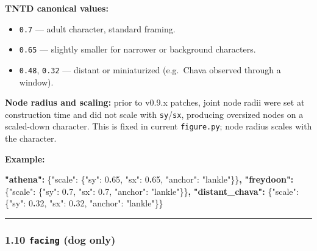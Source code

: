 \documentclass[
  11pt,
]{book}
\newenvironment{Shaded}{}{}
\newcommand{\DataTypeTok}[1]{\textcolor[rgb]{0.56,0.13,0.00}{#1}}
\newcommand{\DecValTok}[1]{\textcolor[rgb]{0.25,0.63,0.44}{#1}}
\newcommand{\ErrorTok}[1]{\textcolor[rgb]{1.00,0.00,0.00}{\textbf{#1}}}
\newcommand{\FunctionTok}[1]{\textcolor[rgb]{0.02,0.16,0.49}{#1}}
\newcommand{\StringTok}[1]{\textcolor[rgb]{0.25,0.44,0.63}{#1}}
\providecommand{\tightlist}{%
  \setlength{\itemsep}{0pt}\setlength{\parskip}{0pt}}
\begin{document}
\textbf{TNTD canonical values:}

\begin{itemize}
\tightlist
\item
  \texttt{0.7} --- adult character, standard framing.
\item
  \texttt{0.65} --- slightly smaller for narrower or background
  characters.
\item
  \texttt{0.48}, \texttt{0.32} --- distant or miniaturized (e.g.~Chava
  observed through a window).
\end{itemize}

\textbf{Node radius and scaling:} prior to v0.9.x patches, joint node
radii were set at construction time and did not scale with
\texttt{sy}/\texttt{sx}, producing oversized nodes on a scaled-down
character. This is fixed in current \texttt{figure.py}; node radius
scales with the character.

\textbf{Example:}

\begin{Shaded}
\begin{Highlighting}[]
\ErrorTok{"athena":}  \FunctionTok{\{}\DataTypeTok{"scale"}\FunctionTok{:} \FunctionTok{\{}\DataTypeTok{"sy"}\FunctionTok{:} \DecValTok{0}\ErrorTok{.}\DecValTok{65}\FunctionTok{,} \DataTypeTok{"sx"}\FunctionTok{:} \DecValTok{0}\ErrorTok{.}\DecValTok{65}\FunctionTok{,} \DataTypeTok{"anchor"}\FunctionTok{:} \StringTok{"lankle"}\FunctionTok{\}\}}\ErrorTok{,}
\ErrorTok{"freydoon":} \FunctionTok{\{}\DataTypeTok{"scale"}\FunctionTok{:} \FunctionTok{\{}\DataTypeTok{"sy"}\FunctionTok{:} \DecValTok{0}\ErrorTok{.}\DecValTok{7}\FunctionTok{,}  \DataTypeTok{"sx"}\FunctionTok{:} \DecValTok{0}\ErrorTok{.}\DecValTok{7}\FunctionTok{,}  \DataTypeTok{"anchor"}\FunctionTok{:} \StringTok{"lankle"}\FunctionTok{\}\}}\ErrorTok{,}
\ErrorTok{"distant\_chava":} \FunctionTok{\{}\DataTypeTok{"scale"}\FunctionTok{:} \FunctionTok{\{}\DataTypeTok{"sy"}\FunctionTok{:} \DecValTok{0}\ErrorTok{.}\DecValTok{32}\FunctionTok{,} \DataTypeTok{"sx"}\FunctionTok{:} \DecValTok{0}\ErrorTok{.}\DecValTok{32}\FunctionTok{,} \DataTypeTok{"anchor"}\FunctionTok{:} \StringTok{"lankle"}\FunctionTok{\}\}}
\end{Highlighting}
\end{Shaded}

\begin{center}\rule{0.5\linewidth}{0.5pt}\end{center}

\subsubsection{\texorpdfstring{1.10 \texttt{facing} (dog
only)}{1.10 facing (dog only)}}\label{facing-dog-only}
\end{document}

